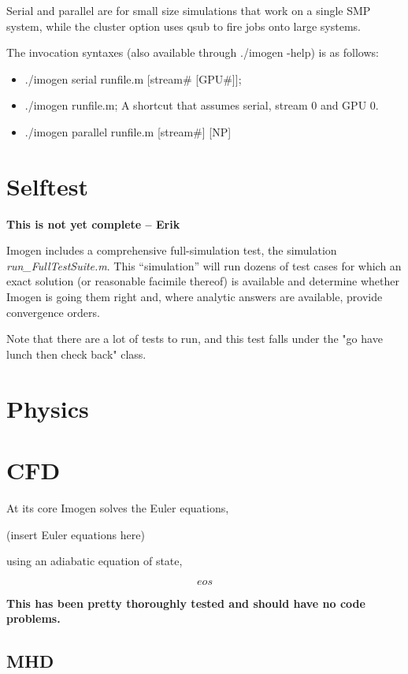 \documentclass[letterpaper,12pt,twocolumn]{article}
\begin{document}
Serial and parallel are for small size simulations that work on a single SMP system,
while the cluster option uses qsub to fire jobs onto large systems.

The invocation syntaxes (also available through ./imogen -help) is as follows:
\begin{itemize}
\item ./imogen serial runfile.m [stream\# [GPU\#]];
\item ./imogen runfile.m; A shortcut that assumes serial, stream 0 and GPU 0.
\item ./imogen parallel runfile.m [stream\#] [NP]
\end{itemize}

\section{Selftest}

\textbf{This is not yet complete -- Erik}

Imogen includes a comprehensive full-simulation test, the simulation
\textit{run\_FullTestSuite.m}. This ``simulation'' will run dozens of test cases
for which an exact solution (or reasonable facimile thereof) is available
and determine whether Imogen is going them right and, where analytic answers
are available, provide convergence orders.

Note that there are a lot of tests to run, and this test falls under the "go have
lunch then check back" class.

\section{Physics}

\section{CFD}

At its core Imogen solves the Euler equations,

(insert Euler equations here)

using an adiabatic equation of state,

\[ eos \]

\textbf{This has been pretty thoroughly tested and should have no code problems.}

\subsection{MHD}
\end{document}
